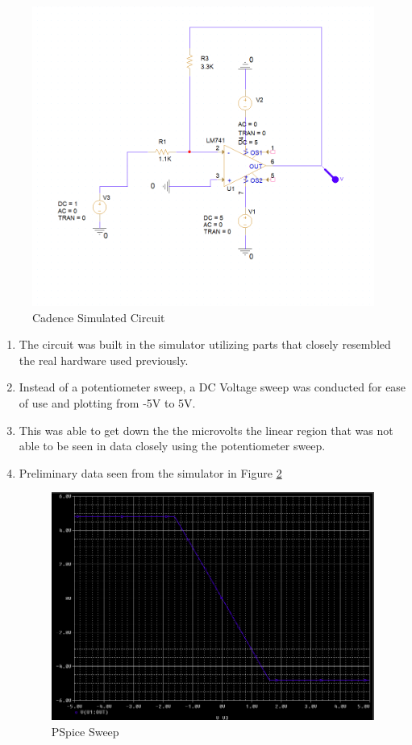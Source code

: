 \documentclass[12pt]{article}
\begin{document}
\begin{figure}[H]
	\centering
	\includegraphics[width=12cm]{03_7}
	\caption{Cadence Simulated Circuit}
	\label{fig:pspicecircuit}
\end{figure}
\begin{enumerate}
	\item The circuit was built in the simulator utilizing parts that closely
	      resembled the real hardware used previously.
	\item Instead of a potentiometer sweep, a DC Voltage sweep was conducted for
	      ease of use and plotting from -5V to 5V.
	\item This was able to get down the the microvolts the linear region that
	      was not able to be seen in data closely using the potentiometer sweep.
	\item Preliminary data seen from the simulator in Figure
	      \ref{fig:pspicesweep}

	      \begin{figure}[H]
		      \centering
		      \includegraphics[width=12cm]{03_6}
		      \caption{PSpice Sweep}
		      \label{fig:pspicesweep}
	      \end{figure}
\end{enumerate}
\end{document}
